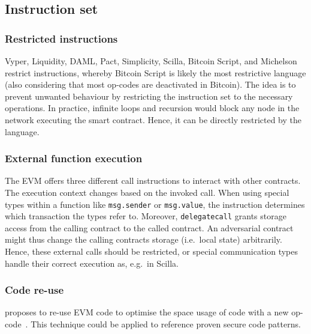 
\subsection{Instruction set}
\subsubsection{Restricted instructions}
Vyper, Liquidity, DAML, Pact, Simplicity, Scilla, Bitcoin Script, and Michelson restrict instructions, whereby Bitcoin Script is likely the most restrictive language (also considering that most op-codes are deactivated in Bitcoin). 
The idea is to prevent unwanted behaviour by restricting the instruction set to the necessary operations.
In practice, infinite loops and recursion would block any node in the network executing the smart contract. Hence, it can be directly restricted by the language.

\subsubsection{External function execution}
The EVM offers three different call instructions to interact with other contracts. The execution context changes based on the invoked call. When using special types within a function like \texttt{msg.sender} or \texttt{msg.value}, the instruction determines which transaction the types refer to. Moreover, \texttt{delegatecall} grants storage access from the calling contract to the called contract. An adversarial contract might thus change the calling contracts storage (i.e.\ local state) arbitrarily. Hence, these external calls should be restricted, or special communication types handle their correct execution as, e.g.\ in Scilla.

\subsubsection{Code re-use}
\citeauthor{Pontiveros2018} proposes to re-use EVM code to optimise the space usage of code with a new op-code~\cite{Pontiveros2018}. This technique could be applied to reference proven secure code patterns.

